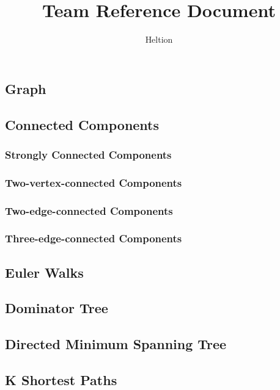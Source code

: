\documentclass{article}
\begin{document}
\title{Team Reference Document}
\author{Heltion}
\maketitle
\newpage
\begin{multicols}{2}
    \tableofcontents
    \newpage

    \section{Graph}
    \subsection{Connected Components}
    \subsubsection{Strongly Connected Components}
    
    \subsubsection{Two-vertex-connected Components}
    
    \subsubsection{Two-edge-connected Components}
    
    \subsubsection{Three-edge-connected Components}
    
    \subsection{Euler Walks}
    
    \subsection{Dominator Tree}
    
    \subsection{Directed Minimum Spanning Tree}
    
    \subsection{K Shortest Paths}
    

\end{multicols}
\end{document}
